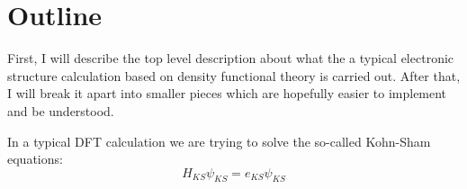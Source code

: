 \section{Outline}

First, I will describe the top level description about what
the a typical electronic structure calculation based on density functional
theory is carried out. After that, I will break it apart into
smaller pieces which are hopefully easier to implement and be understood.

In a typical DFT calculation we are trying to solve the so-called Kohn-Sham
equations:
\begin{equation}
H_{KS} \psi_{KS} = e_{KS} \psi_{KS}
\end{equation}


